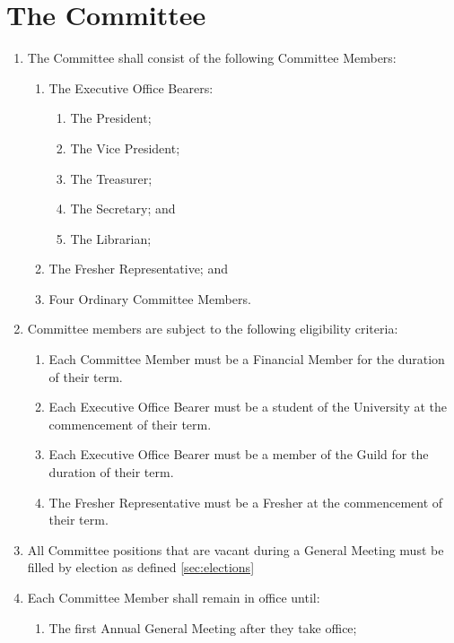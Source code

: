 \documentclass[a4paper]{article}
\begin{document}
\section{The Committee} \label{sec:committee}
\begin{enumerate}
    \item The Committee shall consist of the following Committee Members:
        \begin{enumerate}
            \item The Executive Office Bearers:
                \begin{enumerate}
                    \item The President;
                    \item The Vice President;
                    \item The Treasurer;
                    \item The Secretary; and
                    \item The Librarian;
                \end{enumerate}
            \item The Fresher Representative; and
            \item Four Ordinary Committee Members.
        \end{enumerate}
    \item Committee members are subject to the following eligibility criteria:
        \begin{enumerate}
            \item Each Committee Member must be a Financial Member for the duration of their term.
            \item Each Executive Office Bearer must be a student of the University at the commencement of their term.
            \item Each Executive Office Bearer must be a member of the Guild for the duration of their term.
            \item The Fresher Representative must be a Fresher at the commencement of their term.
        \end{enumerate}
    \item All Committee positions that are vacant during a General Meeting must be filled by election as defined \cref{sec:elections}
    \item Each Committee Member shall remain in office until: 
        \begin{enumerate}
            \item The first Annual General Meeting after they take office;

\end{enumerate}
\end{enumerate}
\end{document}
